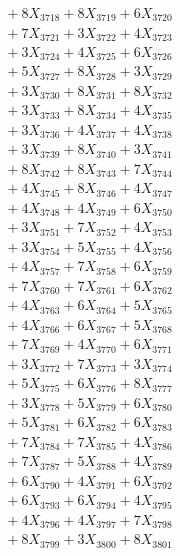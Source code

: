 \documentclass[a4paper,10pt]{article}
\begin{document}
{\begin{align}
&\;  + 8 X_{3718} + 8 X_{3719} + 6 X_{3720} \\[0.3ex]
&\;  + 7 X_{3721} + 3 X_{3722} + 4 X_{3723} \\[0.3ex]
&\;  + 3 X_{3724} + 4 X_{3725} + 6 X_{3726} \\[0.3ex]
&\;  + 5 X_{3727} + 8 X_{3728} + 3 X_{3729} \\[0.5ex]\allowbreak
&\;  + 3 X_{3730} + 8 X_{3731} + 8 X_{3732} \\[0.3ex]
&\;  + 3 X_{3733} + 8 X_{3734} + 4 X_{3735} \\[0.3ex]
&\;  + 3 X_{3736} + 4 X_{3737} + 4 X_{3738} \\[0.3ex]
&\;  + 3 X_{3739} + 8 X_{3740} + 3 X_{3741} \\[0.3ex]
&\;  + 8 X_{3742} + 8 X_{3743} + 7 X_{3744} \\[0.3ex]
&\;  + 4 X_{3745} + 8 X_{3746} + 4 X_{3747} \\[0.3ex]
&\;  + 4 X_{3748} + 4 X_{3749} + 6 X_{3750} \\[0.3ex]
&\;  + 3 X_{3751} + 7 X_{3752} + 4 X_{3753} \\[0.3ex]
&\;  + 3 X_{3754} + 5 X_{3755} + 4 X_{3756} \\[0.3ex]
&\;  + 4 X_{3757} + 7 X_{3758} + 6 X_{3759} \\[0.5ex]\allowbreak
&\;  + 7 X_{3760} + 7 X_{3761} + 6 X_{3762} \\[0.3ex]
&\;  + 4 X_{3763} + 6 X_{3764} + 5 X_{3765} \\[0.3ex]
&\;  + 4 X_{3766} + 6 X_{3767} + 5 X_{3768} \\[0.3ex]
&\;  + 7 X_{3769} + 4 X_{3770} + 6 X_{3771} \\[0.3ex]
&\;  + 3 X_{3772} + 7 X_{3773} + 3 X_{3774} \\[0.3ex]
&\;  + 5 X_{3775} + 6 X_{3776} + 8 X_{3777} \\[0.3ex]
&\;  + 3 X_{3778} + 5 X_{3779} + 6 X_{3780} \\[0.3ex]
&\;  + 5 X_{3781} + 6 X_{3782} + 6 X_{3783} \\[0.3ex]
&\;  + 7 X_{3784} + 7 X_{3785} + 4 X_{3786} \\[0.3ex]
&\;  + 7 X_{3787} + 5 X_{3788} + 4 X_{3789} \\[0.5ex]\allowbreak
&\;  + 6 X_{3790} + 4 X_{3791} + 6 X_{3792} \\[0.3ex]
&\;  + 6 X_{3793} + 6 X_{3794} + 4 X_{3795} \\[0.3ex]
&\;  + 4 X_{3796} + 4 X_{3797} + 7 X_{3798} \\[0.3ex]
&\;  + 8 X_{3799} + 3 X_{3800} + 8 X_{3801} \\[0.3ex]

\end{align}}
\end{document}
